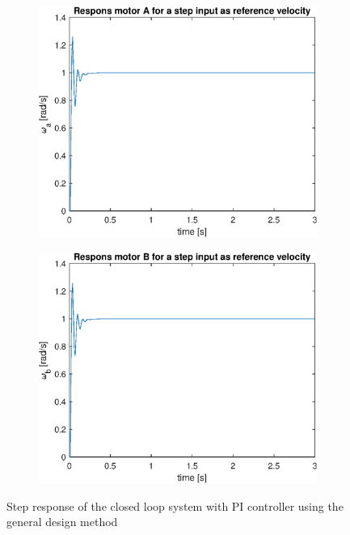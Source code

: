 \documentclass[a4paper,kul]{kulakarticle} %
\begin{document}
\begin{figure}[htp!]
	\centering
	\begin{subfigure}[b]{0.485\textwidth}
		\centering
		\includegraphics[width=\linewidth]{stepresponsA_cl_method1.eps}
		
	\end{subfigure}
	\hfill
	\begin{subfigure}[b]{0.5\textwidth}  
		\centering
		\includegraphics[width=\linewidth]{stepresponsB_cl_method1.eps}
		
	\end{subfigure}
	\caption{Step response of the closed loop system with PI controller using the general design method}
	\label{fig:stepresponseclmethod1}
\end{figure}
\end{document}
